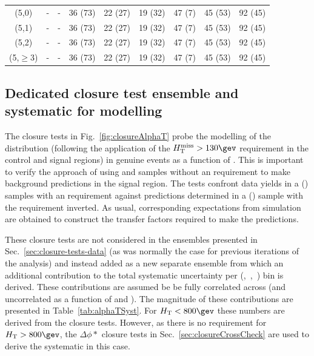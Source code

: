 \begin{table}[h!]
\begin{tabular}{ ccccccccc }
    (5,0)       & -       & -       & 36 (73) & 22 (27) & 19 (32) & 47 (7)  & 45 (53)  & 92   (45) \\
    (5,1)       & -       & -       & 36 (73) & 22 (27) & 19 (32) & 47 (7)  & 45 (53)  & 92   (45) \\
    (5,2)       & -       & -       & 36 (73) & 22 (27) & 19 (32) & 47 (7)  & 45 (53)  & 92   (45) \\
    (5,$\geq$3) & -       & -       & 36 (73) & 22 (27) & 19 (32) & 47 (7)  & 45 (53)  & 92   (45) \\
    \hline
    \hline
  \end{tabular}
\end{table}

\subsection{Dedicated closure test ensemble and systematic for \alphat modelling}
\label{sec:alphat_closure} 

The closure tests in Fig.~\ref{fig:closureAlphaT} probe the modelling
of the \alphat distribution (following the application of the $\mht >
130\gev$ requirement in the control and signal regions) in genuine
\met events as a function of \scalht. This is important to verify the
approach of using \mj and \mmj samples without an \alphat requirement
to make background predictions in the signal region. The tests
confront data yields in a \mj (\mmj) samples with an \alphat
requirement against predictions determined in a \mj (\mmj) sample with
the \alphat requirement inverted. As usual, corresponding expectations
from simulation are obtained to construct the transfer factors
required to make the predictions.

These closure tests are not considered in the ensembles presented in
Sec.~\ref{sec:closure-tests-data} (as was normally the case for
previous iterations of the analysis) and instead added as a new
separate ensemble from which an additional contribution to the total
systematic uncertainty per (\njet,~\nb,~\scalht) bin is derived. These
contributions are assumed be be fully correlated across \nb (and
uncorrelated as a function of \njet and \scalht). The magnitude of
these contributions are presented in Table~\ref{tab:alphaTSyst}. For
$\scalht<800\gev$ these numbers are derived from the \alphat closure
tests. However, as there is no \alphat requirement for
$\scalht>800\gev$, the $\Delta\phi *$ closure tests in
Sec.~\ref{sec:closureCrossCheck} are used to derive the systematic in
this case.

